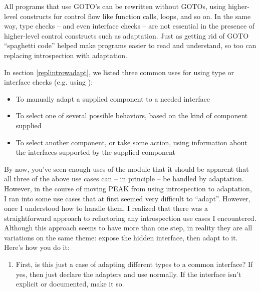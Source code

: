 \begin{verbatim%
}
\begin{verbatim%
}
\begin{verbatim%
}
\begin{verbatim%
}
\begin{verbatim%
}
\begin{verbatim%
}
\begin{verbatim%
}
\begin{verbatim%
}
\begin{verbatim%
}
\begin{verbatim%
}
\begin{verbatim%
}
\begin{verbatim%
}
\begin{verbatim%
}
\begin{verbatim%
}
All programs that use GOTO's can be rewritten without GOTOs, using higher-level
constructs for control flow like function calls,  loops, and so on.
In the same way, type checks -- and even interface checks -- are not essential
in the presence of higher-level control constructs such as adaptation.  Just as
getting rid of GOTO ``spaghetti code'' helped make programs easier to read and
understand, so too can replacing introspection with adaptation.

In section \ref{replintrowadapt}, we listed three common uses for using
type or interface checks (e.g. using ):

\begin{itemize}

\item To manually adapt a supplied component to a needed interface

\item To select one of several possible behaviors, based on the kind of
component supplied

\item To select another component, or take some action, using information
about the interfaces supported by the supplied component

\end{itemize}

By now, you've seen enough uses of the  module that it should
be apparent that all three of the above use cases can -- in principle -- be
handled by adaptation.  However, in the course of moving PEAK from using
introspection to adaptation, I ran into some use cases that at first seemed
very difficult to ``adapt''.  However, once I understood how to handle them,
I realized that there was a straightforward approach to refactoring any
introspection use cases I encountered.  Although this approach seems to have
more than one step, in reality they are all variations on the same theme: expose
the hidden interface, then adapt to it.  Here's how you do it:

\begin{enumerate}
\item First, is this just a case of adapting different types to a common
interface?  If yes, then just declare the adapters and use 
normally.  If the interface isn't explicit or documented, make it so.


\end{enumerate}
\end{verbatim%
}
\end{verbatim%
}
\end{verbatim%
}
\end{verbatim%
}
\end{verbatim%
}
\end{verbatim%
}
\end{verbatim%
}
\end{verbatim%
}
\end{verbatim%
}
\end{verbatim%
}
\end{verbatim%
}
\end{verbatim%
}
\end{verbatim%
}
\end{verbatim%
}
